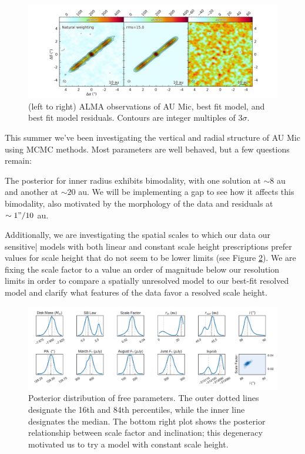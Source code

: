 \documentclass[12pt,modern]{article}
\begin{document}
\begin{figure}
  \includegraphics[width=\linewidth]{run6_bestfit_global_concise}
  \caption{(left to right) ALMA observations of AU Mic, best fit model, and best fit model residuals. Contours are integer multiples of 3$\sigma$.}
  \label{fig:bf}
\end{figure}

This summer we've been investigating the vertical and radial structure of AU Mic using MCMC methods. 
Most parameters are well behaved, but a few questions remain:
  
The posterior for inner radius exhibits bimodality, with one solution at $\sim 8$ au and another at $\sim 20$ au. 
We will be implementing a gap to see how it affects this bimodality, also motivated by the morphology of the data and residuals at $\sim 1"/10$ au.
  
Additionally, we are investigating the spatial scales to which our data our sensitive| models with both linear and constant scale height prescriptions prefer values for scale height that do not seem to be lower limits (see Figure \ref{fig:kde}).
We are fixing the scale factor to a value an order of magnitude below our resolution limits in order to compare a spatially unresolved model to our best-fit resolved model and clarify what features of the data favor a resolved scale height.

\begin{figure}[h]
  \centering
  \includegraphics[width=\linewidth]{run6_kde}
  \caption{Posterior distribution of free parameters. The outer dotted lines designate the 16th and 84th percentiles, while the inner line designates the median. The bottom right plot shows the posterior relationship between scale factor and inclination; this degeneracy motivated us to try a model with constant scale height.}
  \label{fig:kde}
\end{figure}
\end{document}
